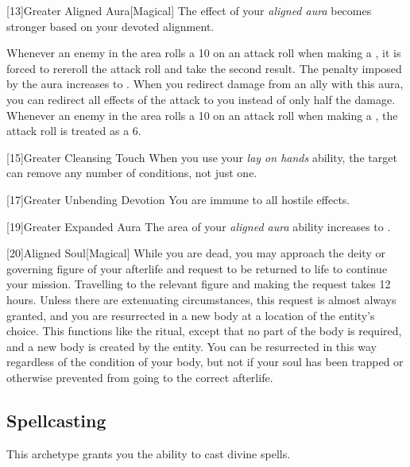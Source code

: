         [13]{Greater Aligned Aura}[Magical]
        The effect of your \textit{aligned aura} becomes stronger based on your devoted alignment.

         Whenever an enemy in the area rolls a 10 on an attack roll when making a , it is forced to rereroll the attack roll and take the second result.
         The penalty imposed by the aura increases to .
         When you redirect damage from an ally with this aura, you can redirect all effects of the attack to you instead of only half the damage.
         Whenever an enemy in the area rolls a 10 on an attack roll when making a , the attack roll is treated as a 6.

        [15]{Greater Cleansing Touch} When you use your \textit{lay on hands} ability, the target can remove any number of conditions, not just one.

        [17]{Greater Unbending Devotion}
        You are immune to all hostile  effects.

        [19]{Greater Expanded Aura} The area of your \textit{aligned aura} ability increases to \areahuge.

        [20]{Aligned Soul}[Magical]
        While you are dead, you may approach the deity or governing figure of your afterlife and request to be returned to life to continue your mission.
        Travelling to the relevant figure and making the request takes 12 hours.
        Unless there are extenuating circumstances, this request is almost always granted, and you are resurrected in a new body at a location of the entity's choice.
        This functions like the  ritual, except that no part of the body is required, and a new body is created by the entity.
        You can be resurrected in this way regardless of the condition of your body, but not if your soul has been trapped or otherwise prevented from going to the correct afterlife.

    \subsection{Spellcasting}
        This archetype grants you the ability to cast divine spells.

